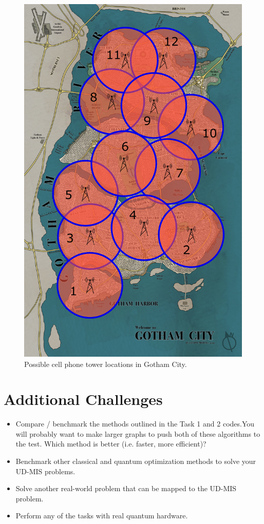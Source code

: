 \documentclass[12pt]{article}
\begin{document}
\begin{figure}
    \begin{center}
        \includegraphics[width=0.4\linewidth]{images/gothamcity.png}
    \end{center}
    \caption{Possible cell phone tower locations in Gotham City.} \label{fig:gotham}
\end{figure}

\section*{Additional Challenges}

\begin{itemize}
	\item Compare / benchmark the methods outlined in the Task 1 and 2 codes.You will probably want to make larger graphs to push both of these algorithms to the test. Which method is better (i.e. faster, more efficient)?
	\item Benchmark other classical and quantum optimization methods to solve your UD-MIS problems.  
	\item Solve another real-world problem that can be mapped to the UD-MIS problem.
	\item Perform any of the tasks with real quantum hardware.

\end{itemize}



\end{document}
